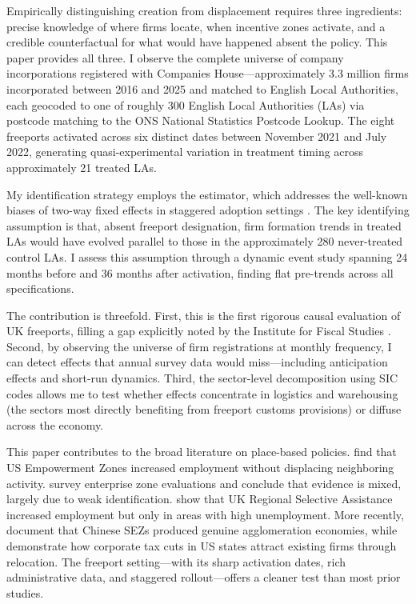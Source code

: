 \documentclass[12pt]{article}
\begin{document}
Empirically distinguishing creation from displacement requires three ingredients: precise knowledge of where firms locate, when incentive zones activate, and a credible counterfactual for what would have happened absent the policy. This paper provides all three. I observe the complete universe of company incorporations registered with Companies House---approximately 3.3 million firms incorporated between 2016 and 2025 and matched to English Local Authorities, each geocoded to one of roughly 300 English Local Authorities (LAs) via postcode matching to the ONS National Statistics Postcode Lookup. The eight freeports activated across six distinct dates between November 2021 and July 2022, generating quasi-experimental variation in treatment timing across approximately 21 treated LAs.

My identification strategy employs the \citet{callaway2021difference} estimator, which addresses the well-known biases of two-way fixed effects in staggered adoption settings \citep{goodman2021difference, sun2021estimating, borusyak2024revisiting}. The key identifying assumption is that, absent freeport designation, firm formation trends in treated LAs would have evolved parallel to those in the approximately 280 never-treated control LAs. I assess this assumption through a dynamic event study spanning 24 months before and 36 months after activation, finding flat pre-trends across all specifications.

The contribution is threefold. First, this is the first rigorous causal evaluation of UK freeports, filling a gap explicitly noted by the Institute for Fiscal Studies \citep{ifs2023freeports}. Second, by observing the universe of firm registrations at monthly frequency, I can detect effects that annual survey data would miss---including anticipation effects and short-run dynamics. Third, the sector-level decomposition using SIC codes allows me to test whether effects concentrate in logistics and warehousing (the sectors most directly benefiting from freeport customs provisions) or diffuse across the economy.

This paper contributes to the broad literature on place-based policies. \citet{busso2013assessing} find that US Empowerment Zones increased employment without displacing neighboring activity. \citet{neumark2015enterprise} survey enterprise zone evaluations and conclude that evidence is mixed, largely due to weak identification. \citet{criscuolo2019} show that UK Regional Selective Assistance increased employment but only in areas with high unemployment. More recently, \citet{chen2021impact} document that Chinese SEZs produced genuine agglomeration economies, while \citet{giroud2019} demonstrate how corporate tax cuts in US states attract existing firms through relocation. The freeport setting---with its sharp activation dates, rich administrative data, and staggered rollout---offers a cleaner test than most prior studies.
\end{document}

